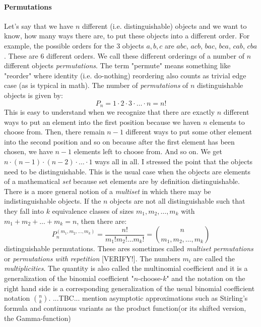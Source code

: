 \paragraph{Permutations}
Let's say that we have $n$ different (i.e. distinguishable) objects and we want to know, how many ways there are, to put these objects into a different order. For example, the possible orders for the $3$ objects $a,b,c$ are $abc$, $acb$, $bac$, $bca$, $cab$, $cba$. These are $6$ different orders. We call these different orderings of a number of $n$ different objects \emph{permutations}. The term "permute" means something like "reorder" where identity (i.e. do-nothing) reordering also counts as trivial edge case (as is typical in math). The number of \emph{permutations} of $n$ distinguishable objects is given by:
\begin{equation}
P_n = 1 \cdot 2 \cdot 3 \cdot \ldots \cdot n = n!
\end{equation}
This is easy to understand when we recognize that there are exactly $n$ different ways to put an element into the first position because we haven $n$ elements to choose from. Then, there remain $n-1$ different ways to put some other element into the second position and so on because after the first element has been chosen, we have $n-1$ elements left to choose from. And so on. We get $n\cdot(n-1)\cdot(n-2)\cdot\ldots\cdot1$ ways all in all. I stressed the point that the objects need to be distinguishable. This is the usual case when the objects are elements of a mathematical \emph{set} because set elements are by definition distinguishable. There is a more general notion of a \emph{multiset} in which there may be indistinguishable objects. If the $n$ objects are not all distinguishable such that they fall into $k$ equivalence classes of sizes $m_1, m_2, \ldots, m_k$ with $m_1 + m_2 + \ldots + m_k = n$, then there are:
\begin{equation}
P_n^{(m_1,m_2,\ldots,m_k)} 
= \frac{n!}{m_1! m_2! \ldots m_k!} 
= \binom{n}{m_1,m_2,\ldots, m_k}
\end{equation}
distinguishable permutations. These ares sometimes called \emph{multiset permutations} or \emph{permutations with repetition} [VERIFY!]. The numbers $m_i$ are called the \emph{multiplicities}. The quantity is also called the multinomial coefficient and it is a generalization of the binomial coefficient "$n$-choose-$k$" and the notation on the right hand side is a corresponding generalization of the usual binomial coefficient notation $\binom{n}{k}$. ...TBC... mention asymptotic approximations such as Stirling's formula and continuous variants as the product function(or its shifted version, the Gamma-function)

